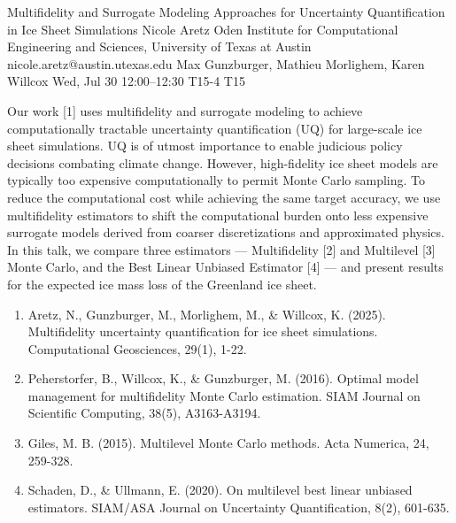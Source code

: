 \documentclass[12pt,lettersize,oneside]{book} %
\begin{document}
\begin{talk}
  {Multifidelity and Surrogate Modeling Approaches for Uncertainty Quantification in Ice Sheet Simulations}%
  {Nicole Aretz}%
  {Oden Institute for Computational Engineering and Sciences, University of Texas at Austin}%
  {nicole.aretz@austin.utexas.edu}%
  {Max Gunzburger, Mathieu Morlighem, Karen Willcox}%
  {}%
  {Wed, Jul 30 12:00--12:30}%
  {T15-4}%
  {T15}%
  
    
   
Our work [1] uses multifidelity and surrogate modeling to achieve computationally tractable uncertainty quantification (UQ) for large-scale ice sheet simulations. UQ is of utmost importance to enable judicious policy decisions combating climate change. However, high-fidelity ice sheet models are typically too expensive computationally to permit Monte Carlo sampling. To reduce the computational cost while achieving the same target accuracy, we use multifidelity estimators to shift the computational burden onto less expensive surrogate models derived from coarser discretizations and approximated physics. In this talk, we compare three estimators — Multifidelity [2] and Multilevel [3] Monte Carlo, and the Best Linear Unbiased Estimator [4] — and present results for the expected ice mass loss of the Greenland ice sheet.

\medskip

\begin{enumerate}
 \item[{[1]}] Aretz, N., Gunzburger, M., Morlighem, M., \& Willcox, K. (2025). Multifidelity uncertainty quantification for ice sheet simulations. Computational Geosciences, 29(1), 1-22.
 \item[{[2]}] Peherstorfer, B., Willcox, K., \& Gunzburger, M. (2016). Optimal model management for multifidelity Monte Carlo estimation. SIAM Journal on Scientific Computing, 38(5), A3163-A3194.
    \item[{[3]}] Giles, M. B. (2015). Multilevel Monte Carlo methods. Acta Numerica, 24, 259-328.
    \item[{[4]}] Schaden, D., \& Ullmann, E. (2020). On multilevel best linear unbiased estimators. SIAM/ASA Journal on Uncertainty Quantification, 8(2), 601-635.
\end{enumerate}

\end{talk}
\end{document}
